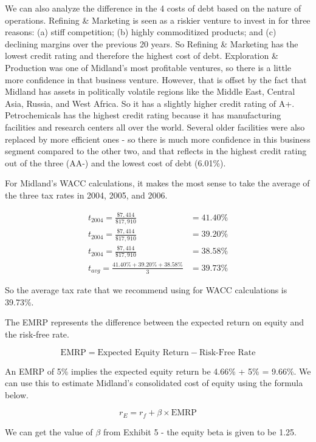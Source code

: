 \documentclass[letterpaper]{article}
\begin{document}
We can also analyze the difference in the 4 costs of debt based on the nature of operations. Refining \& Marketing is seen as a riskier venture to invest in for three reasons: (a) stiff competition; (b) highly commoditized products; and (c) declining margins over the previous 20 years. So Refining \& Marketing has the lowest credit rating and therefore the highest cost of debt. Exploration \& Production was one of Midland's most profitable ventures, so there is a little more confidence in that business venture. However, that is offset by the fact that Midland has assets in politically volatile regions like the Middle East, Central Asia, Russia, and West Africa. So it has a slightly higher credit rating of A+. Petrochemicals has the highest credit rating because it has manufacturing facilities and research centers all over the world. Several older facilities were also replaced by more efficient ones - so there is much more confidence in this business segment compared to the other two, and that reflects in the highest credit rating out of the three (AA-) and the lowest cost of debt (6.01\%).

For Midland's WACC calculations, it makes the most sense to take the average of the three tax rates in 2004, 2005, and 2006.

\begin{align*}
    t_{2004} = \frac{\$7,414}{\$17,910} &= 41.40\% \\
    t_{2004} = \frac{\$7,414}{\$17,910} &= 39.20\% \\
    t_{2004} = \frac{\$7,414}{\$17,910} &= 38.58\% \\
    t_{avg} = \frac{41.40\% + 39.20\% + 38.58\%}{3} &= 39.73\%
\end{align*}

So the average tax rate that we recommend using for WACC calculations is 39.73\%.

The EMRP represents the difference between the expected return on equity and the risk-free rate. 

\[
\text{EMRP} = \text{Expected Equity Return} - \text{Risk-Free Rate}
\]

An EMRP of 5\% implies the expected equity return be 4.66\% + 5\% = 9.66\%. We can use this to estimate Midland's consolidated cost of equity using the formula below.

\[
r_E = r_f + \beta \times \text{EMRP}
\]

We can get the value of $\beta$ from Exhibit 5 - the equity beta is given to be 1.25.
\end{document}
